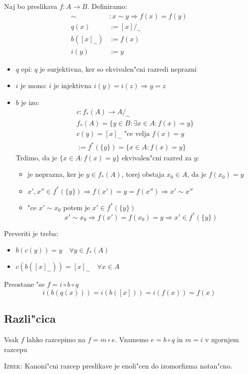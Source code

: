 Naj bo preslikava $f: A \to B$. Definiramo:
\begin{align*}
\sim&: x \sim y \Rightarrow f(x) = f(y) \\
q(x) &:= [x]/_\sim \\
b([x]_\sim) &:= f(x) \\
i(y) &:= y
\end{align*}
\begin{itemize}
	\item $q$ epi: $q$ je surjektivna, ker so ekvivalen"cni razredi neprazni
	\item $i$ je mono: $i$ je injektivna $i(y) = i(z) \Rightarrow y = z$
	\item $b$ je izo:
	\begin{gather*}
		c : f_*(A) \to A/_\sim \\
		 f_*(A) = \{y \in B: \exists x \in A: f(x) = y\} \\
		 c(y) = [x]_\sim \text{ "ce velja $f(x) = y$} \\
		 := f^*(\{y\}) = \{x \in A: f(x) = y\}
	\end{gather*}
	Trdimo, da je $\{x \in A: f(x)= y\}$ ekvivalen"cni razred za $y$:
	\begin{itemize}
		\item je neprazna, ker je $y \in f_*(A)$, torej obstaja $x_0 \in A$, da je $f(x_0) = y$
		\item $x', x'' \in f^*(\{y\}) \Rightarrow f(x') = y = f(x'') \Rightarrow x' \sim x''$
		\item "ce $x' \sim x_0$ potem je $x' \in f^*(\{y\})$
		\begin{equation*}
		x' \sim x_0 \Rightarrow f(x') = f(x_0) = y \Rightarrow x' \in f^*(\{y\})
		\end{equation*}
	\end{itemize}
\end{itemize}
Preveriti je treba:
\begin{itemize}
	\item $b(c(y)) = y \quad \forall y \in f_*(A)$
	\item $c(b([x]_\sim)) = [x]_\sim \quad \forall x \in A$
\end{itemize}
Preostane "se $f = i \circ b \circ q$
\begin{equation*}
i(b(q(x))) = i(b([x])) = i(f(x)) = f(x)
\end{equation*}
\subsection{Razli"cica}
Vsak $f$ lahko razcepimo na $f = m \circ e$. Vzamemo $e = b \circ q$ in $m = i$ v zgornjem razcepu

\textsc{Izrek:} Kanoni"cni razcep preslikave je enoli"cen do izomorfizma natan"cno.
